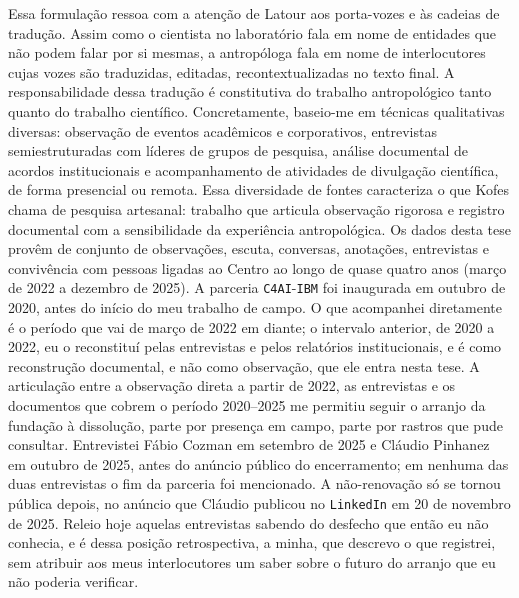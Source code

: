 Essa formulação ressoa com a atenção de Latour aos porta-vozes e às cadeias de tradução. Assim como o cientista no laboratório fala em nome de entidades que não podem falar por si mesmas, a antropóloga fala em nome de interlocutores cujas vozes são traduzidas, editadas, recontextualizadas no texto final. A responsabilidade dessa tradução é constitutiva do trabalho antropológico tanto quanto do trabalho científico. Concretamente, baseio-me em técnicas qualitativas diversas: observação de eventos acadêmicos e corporativos, entrevistas semiestruturadas com líderes de grupos de pesquisa, análise documental de acordos institucionais e acompanhamento de atividades de divulgação científica, de forma presencial ou remota. Essa diversidade de fontes caracteriza o que Kofes chama de pesquisa artesanal: trabalho que articula observação rigorosa e registro documental com a sensibilidade da experiência antropológica. Os dados desta tese provêm de conjunto de observações, escuta, conversas, anotações, entrevistas e convivência com pessoas ligadas ao Centro ao longo de quase quatro anos (março de 2022 a dezembro de 2025). A parceria \texttt{C4AI}-\texttt{IBM} foi inaugurada em outubro de 2020, antes do início do meu trabalho de campo. O que acompanhei diretamente é o período que vai de março de 2022 em diante; o intervalo anterior, de 2020 a 2022, eu o reconstituí pelas entrevistas e pelos relatórios institucionais, e é como reconstrução documental, e não como observação, que ele entra nesta tese. A articulação entre a observação direta a partir de 2022, as entrevistas e os documentos que cobrem o período 2020--2025 me permitiu seguir o arranjo da fundação à dissolução, parte por presença em campo, parte por rastros que pude consultar. Entrevistei Fábio Cozman em setembro de 2025 e Cláudio Pinhanez em outubro de 2025, antes do anúncio público do encerramento; em nenhuma das duas entrevistas o fim da parceria foi mencionado. A não-renovação só se tornou pública depois, no anúncio que Cláudio publicou no \texttt{LinkedIn} em 20 de novembro de 2025. Releio hoje aquelas entrevistas sabendo do desfecho que então eu não conhecia, e é dessa posição retrospectiva, a minha, que descrevo o que registrei, sem atribuir aos meus interlocutores um saber sobre o futuro do arranjo que eu não poderia verificar.
 
